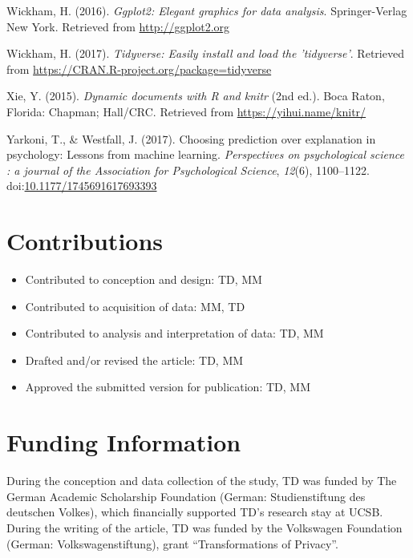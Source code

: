 \documentclass[man,floatsintext]{apa6}
\providecommand{\tightlist}{%
  \setlength{\itemsep}{0pt}\setlength{\parskip}{0pt}}
\begin{document}
\leavevmode\hypertarget{ref-R-ggplot2}{}%
Wickham, H. (2016). \emph{Ggplot2: Elegant graphics for data analysis}. Springer-Verlag New York. Retrieved from \url{http://ggplot2.org}

\leavevmode\hypertarget{ref-R-tidyverse}{}%
Wickham, H. (2017). \emph{Tidyverse: Easily install and load the 'tidyverse'}. Retrieved from \url{https://CRAN.R-project.org/package=tidyverse}

\leavevmode\hypertarget{ref-R-knitr}{}%
Xie, Y. (2015). \emph{Dynamic documents with R and knitr} (2nd ed.). Boca Raton, Florida: Chapman; Hall/CRC. Retrieved from \url{https://yihui.name/knitr/}

\leavevmode\hypertarget{ref-Yarkoni.2017}{}%
Yarkoni, T., \& Westfall, J. (2017). Choosing prediction over explanation in psychology: Lessons from machine learning. \emph{Perspectives on psychological science : a journal of the Association for Psychological Science}, \emph{12}(6), 1100--1122. doi:\href{https://doi.org/10.1177/1745691617693393}{10.1177/1745691617693393}

\endgroup

\newpage

\hypertarget{contributions}{%
\section{Contributions}\label{contributions}}

\begin{itemize}
\tightlist
\item
  Contributed to conception and design: TD, MM
\item
  Contributed to acquisition of data: MM, TD
\item
  Contributed to analysis and interpretation of data: TD, MM
\item
  Drafted and/or revised the article: TD, MM
\item
  Approved the submitted version for publication: TD, MM
\end{itemize}

\hypertarget{funding-information}{%
\section{Funding Information}\label{funding-information}}

During the conception and data collection of the study, TD was funded by The German Academic Scholarship Foundation (German: Studienstiftung des deutschen Volkes), which financially supported TD's research stay at UCSB. During the writing of the article, TD was funded by the Volkswagen Foundation (German: Volkswagenstiftung), grant \enquote{Transformations of Privacy}.
\end{document}
